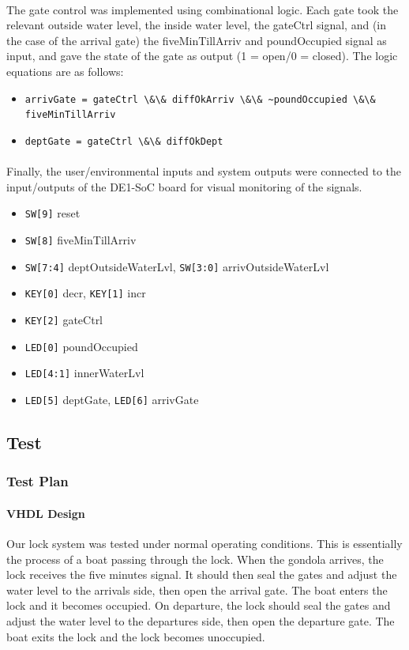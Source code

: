 \documentclass{article}
\begin{document}
      \paragraph{} The gate control was implemented using combinational logic. Each gate took the relevant outside water level, the inside water level, the gateCtrl signal, and (in the case of the arrival gate) the fiveMinTillArriv and poundOccupied signal as input, and gave the state of the gate as output (1 = open/0 = closed). The logic equations are as follows:
      \begin{itemize}
        \item \lstinline{arrivGate = gateCtrl \&\& diffOkArriv \&\& ~poundOccupied \&\& fiveMinTillArriv}
        \item \lstinline{deptGate = gateCtrl \&\& diffOkDept}
      \end{itemize}

      \paragraph{} Finally, the user/environmental inputs and system outputs were connected to the input/outputs of the DE1-SoC board for visual monitoring of the signals.
      \begin{itemize}
        \item \lstinline{SW[9]} reset
        \item \lstinline{SW[8]} fiveMinTillArriv
        \item \lstinline{SW[7:4]} deptOutsideWaterLvl, \lstinline{SW[3:0]} arrivOutsideWaterLvl
        \item \lstinline{KEY[0]} decr, \lstinline{KEY[1]} incr
        \item \lstinline{KEY[2]} gateCtrl
        \item \lstinline{LED[0]} poundOccupied
        \item \lstinline{LED[4:1]} innerWaterLvl
        \item \lstinline{LED[5]} deptGate, \lstinline{LED[6]} arrivGate
      \end{itemize}


	\subsection{Test}
		\subsubsection{Test Plan}
      \paragraph{VHDL Design} Our lock system was tested under normal operating conditions. This is essentially the process of a boat passing through the lock. When the gondola arrives, the lock receives the five minutes signal. It should then seal the gates and adjust the water level to the arrivals side, then open the arrival gate. The boat enters the lock and it becomes occupied. On departure, the lock should seal the gates and adjust the water level to the departures side, then open the departure gate. The boat exits the lock and the lock becomes unoccupied.
\end{document}
